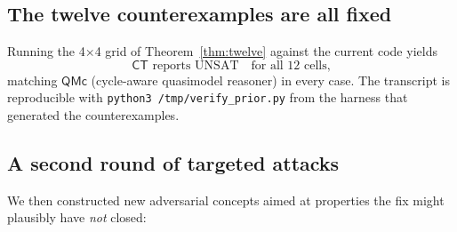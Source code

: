 \documentclass[]{ceurart}
\theoremstyle{definition}
\theoremstyle{remark}
\begin{document}
\subsection{The twelve counterexamples are all fixed}

Running the 4$\times$4 grid of Theorem~\ref{thm:twelve} against the
current code yields
\[
  \mathsf{CT} \text{ reports UNSAT} \quad\text{for all 12 cells,}
\]
matching $\mathsf{QMc}$ (cycle-aware quasimodel reasoner) in every
case. The transcript is reproducible with
\verb|python3 /tmp/verify_prior.py| from the harness that generated
the counterexamples.

\subsection{A second round of targeted attacks}

We then constructed new adversarial concepts aimed at properties the
fix might plausibly have \emph{not} closed:
\end{document}
